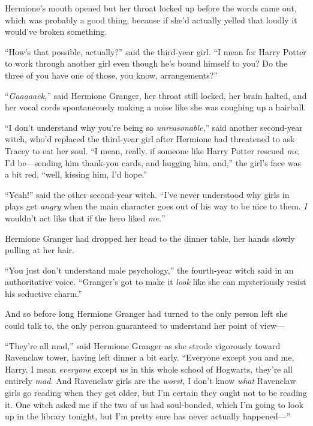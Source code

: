 Hermione’s mouth opened but her throat locked up before the words came out, which was probably a good thing, because if she’d actually yelled that loudly it would’ve broken something.

“How’s that possible, actually?” said the third-year girl. “I mean for Harry Potter to work through another girl even though he’s bound himself to you? Do the three of you have one of those, you know, arrangements?”

“\emph{Gaaaaack,}” said Hermione Granger, her throat still locked, her brain halted, and her vocal cords spontaneously making a noise like she was coughing up a hairball.


“I don’t understand why you’re being so \emph{unreasonable},” said another second-year witch, who’d replaced the third-year girl after Hermione had threatened to ask Tracey to eat her soul. “I mean, really, if someone like Harry Potter rescued \emph{me}, I’d be—sending him thank-you cards, and hugging him, and,” the girl’s face was a bit red, “well, kissing him, I’d hope.”

“Yeah!” said the other second-year witch. “I’ve never understood why girls in plays get \emph{angry} when the main character goes out of his way to be nice to them. \emph{I} wouldn’t act like that if the hero liked \emph{me.}”

Hermione Granger had dropped her head to the dinner table, her hands slowly pulling at her hair.

“You just don’t understand male psychology,” the fourth-year witch said in an authoritative voice. “Granger’s got to make it \emph{look} like she can mysteriously resist his seductive charm.”


And so before long Hermione Granger had turned to the only person left she could talk to, the only person guaranteed to understand her point of view—

“They’re all mad,” said Hermione Granger as she strode vigorously toward Ravenclaw tower, having left dinner a bit early. “Everyone except you and me, Harry, I mean \emph{everyone} except us in this whole school of Hogwarts, they’re all entirely \emph{mad.} And Ravenclaw girls are the \emph{worst,} I don’t know \emph{what} Ravenclaw girls go reading when they get older, but I’m certain they ought not to be reading it. One witch asked me if the two of us had soul-bonded, which I’m going to look up in the library tonight, but I’m pretty sure has never actually happened—”

